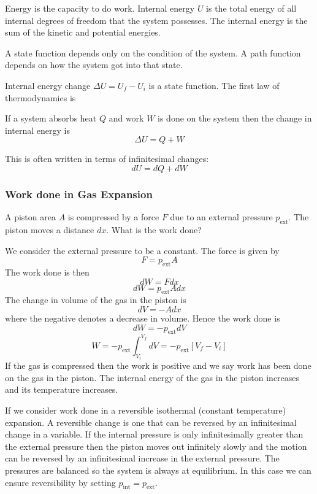 \documentclass{article}
\begin{document}
    Energy is the capacity to do work.
    Internal energy \(U\) is the total energy of all internal degrees of freedom that the system possesses.
    The internal energy is the sum of the kinetic and potential energies.
    
    A state function depends only on the condition of the system.
    A path function depends on how the system got into that state.
    
    Internal energy change \(\Delta U = U_f - U_i\) is a state function.
    The first law of thermodynamics is
    \begin{displayquote}
        If a system absorbs heat \(Q\) and work \(W\) is done on the system then the change in internal energy is
        \[\Delta U = Q + W\]
    \end{displayquote}
    This is often written in terms of infinitesimal changes:
    \[dU = dQ + dW\]
    
    \subsubsection{Work done in Gas Expansion}
    A piston area \(A\) is compressed by a force \(F\) due to an external pressure \(p_\text{ext}\).
    The piston moves a distance \(dx\).
    What is the work done?
    
    We consider the external pressure to be a constant.
    The force is given by
    \[F = p_\text{ext}A\]
    The work done is then
    \[dW = Fdx\]
    \[dW = p_\text{ext}Adx\]
    The change in volume of the gas in the piston is
    \[dV = -Adx\]
    where the negative denotes a decrease in volume.
    Hence the work done is
    \[dW = -p_\text{ext}dV\]
    \[W = -p_\text{ext}\int_{V_i}^{V_f}dV = -p_\text{ext}[V_f - V_i]\]
    If the gas is compressed then the work is positive and we say work has been done on the gas in the piston.
    The internal energy of the gas in the piston increases and its temperature increases.
    
    If we consider work done in a reversible isothermal (constant temperature) expansion. A reversible change is one that can be reversed by an infinitesimal change in a variable.
    If the internal pressure is only infinitesimally greater than the external pressure then the piston moves out infinitely slowly and the motion can be reversed by an infinitesimal increase in the external pressure.
    The pressures are balanced so the system is always at equilibrium.
    In this case we can ensure reversibility by setting \(p_\text{int} = p_\text{ext}\).
    
\end{document}
